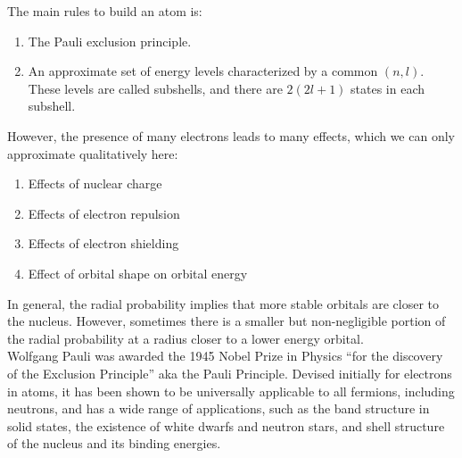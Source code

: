 \documentclass[11pt]{article}
\theoremstyle{break}
\theoremstyle{break}
\begin{document}
The main rules to build an atom is: 
\begin{enumerate}[topsep=3pt,itemsep=-1ex,partopsep=1ex,parsep=1ex]
\item The Pauli exclusion principle. 
\item An approximate set of energy levels characterized by a common $(n,l)$. These levels are called subshells, and there are $2(2l + 1)$ states in each subshell.
\end{enumerate}
However, the presence of many electrons leads to many effects, which we can only approximate qualitatively here:
\begin{enumerate}[topsep=3pt,itemsep=-1ex,partopsep=1ex,parsep=1ex]
\item Effects of nuclear charge
\item Effects of electron repulsion
\item Effects of electron shielding
\item Effect of orbital shape on orbital energy
\end{enumerate}

In general, the radial probability implies that more stable orbitals are closer to the nucleus. 
However, sometimes there is a smaller but non-negligible portion of the radial probability at a radius closer to a lower energy orbital. \\


Wolfgang Pauli was awarded the 1945 Nobel Prize in Physics ``for the discovery of the Exclusion Principle'' aka the Pauli Principle. Devised initially for electrons in atoms, it has been shown to be universally applicable to all fermions, including neutrons, and has a wide range of applications, such as the band structure in solid states, the existence of white dwarfs and neutron stars, and shell structure of the nucleus and its binding energies. \\
\end{document}
